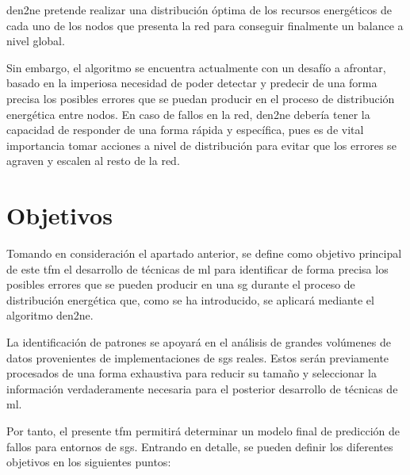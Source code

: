 \vspace{3mm}

\gls{den2ne} pretende realizar una distribución óptima de los recursos energéticos de cada uno de los nodos que presenta la red para conseguir finalmente un balance a nivel global. 


\pagebreak

Sin embargo, el algoritmo se encuentra actualmente con un desafío a afrontar, basado en la imperiosa necesidad de poder detectar y predecir de una forma precisa los posibles errores que se puedan producir en el proceso de distribución energética entre nodos. En caso de fallos en la red, \gls{den2ne} debería tener la capacidad de responder de una forma rápida y específica, pues es de vital importancia tomar acciones a nivel de distribución para evitar que los errores se agraven y escalen al resto de la red.

\vspace{3mm}



\section{Objetivos}
\label{sec:obj}

Tomando en consideración el apartado anterior, se define como objetivo principal de este \gls{tfm} el desarrollo de técnicas de \gls{ml} para identificar de forma precisa los posibles errores que se pueden producir en una \gls{sg} durante el proceso de distribución energética que, como se ha introducido, se aplicará mediante el algoritmo \gls{den2ne}. 

\vspace{3mm}

La identificación de patrones se apoyará en el análisis de grandes volúmenes de datos provenientes de implementaciones de \gls{sg}s reales. Estos serán previamente procesados de una forma exhaustiva para reducir su tamaño y seleccionar la información verdaderamente necesaria para el posterior desarrollo de técnicas de \gls{ml}.

\vspace{3mm}

Por tanto, el presente \gls{tfm} permitirá determinar un modelo final de predicción de fallos para entornos de \gls{sg}s. Entrando en detalle, se pueden definir los diferentes objetivos en los siguientes puntos:


